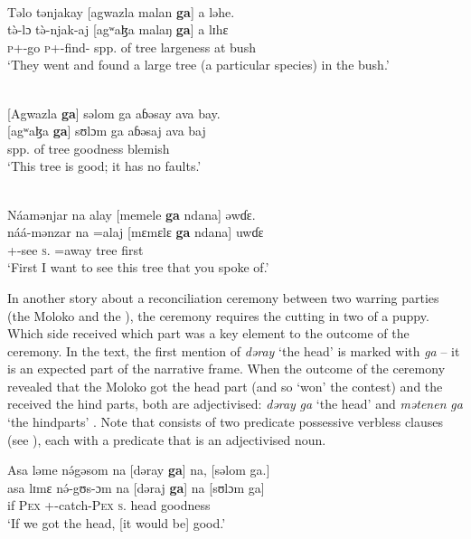 \ea \label{ex:5:52}\\
Təlo  tənjakay  [agwazla  malan  \textbf{ga}]  a  ləhe.\\
\gll  t\`{ə}-lɔ  t\`{ə}-njak-aj        [agʷaɮa      malaŋ    \textbf{ga}]   a    lɪhɛ\\
      \textsc{p}+{\PFV}-go   \textsc{p}+{\PFV}-find-{\CL}   {spp. of tree}     largeness {\ADJ}   at   bush\\
\glt  ‘They went and found a large tree (a particular species) in the bush.’ 
\z


\ea \label{ex:5:53}\\
{}[Agwazla  \textbf{ga}]  səlom  ga  aɓəsay  ava  bay.\\
\gll  {}[agʷaɮa  \textbf{ga}]    sʊlɔm    ga     aɓəsaj     ava     baj\\
      {spp. of tree} {\ADJ}   goodness  {\ADJ}     blemish   {\EXT}   {\NEG}\\
\glt  ‘This tree is good;  it has no faults.’
\z


\ea \label{ex:5:54}\\
Náamənjar  na  alay  [memele  \textbf{ga}  ndana]  əwɗɛ.\\
\gll  náá-mənzar     na  =alaj   [mɛmɛlɛ  \textbf{ga}   ndana]  uwɗɛ\\
      {\oneS}+{\POT}-see     \textsc{s}.{\DO}  =away   tree   {\ADJ}   {\DEM}   first\\
\glt  ‘First I want to see this tree that you spoke of.’
\z

In another story about a reconciliation ceremony between two warring parties (the Moloko and the ), the ceremony requires the cutting in two of a puppy. Which side received which part was a key element to the outcome of the ceremony. In the text, the first mention of \textit{dəray} ‘the head’  is marked with \textit{ga} -- it is an expected part of the narrative frame.  When the outcome of the ceremony revealed that the Moloko got the head part (and so ‘won’ the contest) and the  received the hind parts, both are adjectivised:  \textit{dəray} \textit{ga} ‘the head’ and \textit{mətenen} \textit{ga} ‘the hindparts’ . Note that  consists of two predicate possessive verbless clauses (see ), each with a predicate that is an adjectivised noun. 

\ea \label{ex:5:55}
Asa  ləme  n\'{ə}gəsom  na  [dəray  \textbf{ga}]  na,  [səlom  ga.]\\
\gll  asa  lɪmɛ  n\'{ə}-gʊs-ɔm    na      [dəraj    \textbf{ga}]    na  [sʊlɔm       ga]\\
      if    \textsc{Pex}  +{\IFV}-catch-\textsc{Pex}    \textsc{s}.{\DO}  head  {\ADJ}     {\PSP}  goodness     {\ADJ}\\
\glt  ‘If we got the head, [it would be] good.'
\z

